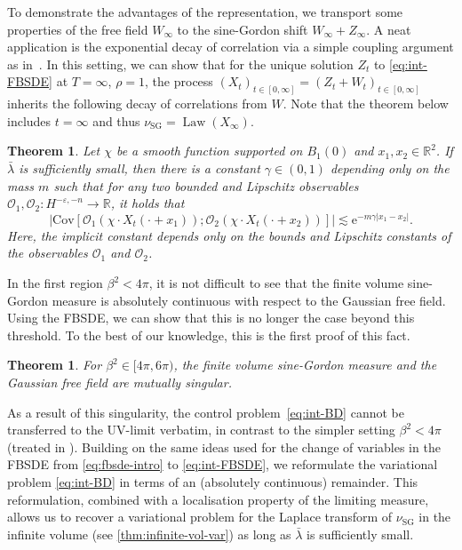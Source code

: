 \documentclass[11pt, a4paper]{scrartcl}
\numberwithin{equation}{section}
\theoremstyle{plain}
\newtheorem{theorem}[foo]{Theorem}
\theoremstyle{remark}
\newcommand{\mathe}{\mathrm{e}}
\newcommand{\tmop}[1]{\ensuremath{\operatorname{#1}}}
\begin{document}
To demonstrate the advantages of the representation, we transport some
properties of the free field $W_{\infty}$ to the sine-Gordon shift $W_{\infty}
+ Z_{\infty}$. A neat application is the exponential decay of correlation via
a simple coupling argument as
in~{\cite{vecchiStochasticAnalysisSubcritical2025, gubinelliDecayCorrelationsStochastic2025}}.
In this setting, we can show that for the unique solution $Z_t$ to
\eqref{eq:int-FBSDE} at $T = \infty$, $\rho = 1$, the process $(X_t)_{t \in
[0, \infty]} = (Z_t + W_t)_{t \in [0, \infty]}$ inherits the following decay
of correlations from $W$. Note that the theorem below includes $t = \infty$
and thus $\nu_{\tmop{SG}} = \tmop{Law} (X_{\infty})$.

\begin{theorem}
  \label{thm:decay-of-correlations}Let $\chi$ be a smooth function supported
  on $B_1 (0)$ and $x_1, x_2 \in \mathbb{R}^2$. If $\bar{\lambda}$ is sufficiently small,
  then there is a constant
  $\gamma \in (0, 1)$ depending only on the mass $m$ such that for any two
  bounded and Lipschitz observables $\mathcal{O}_1, \mathcal{O}_2 : H^{-
  \varepsilon, - n} \rightarrow \mathbb{R}$, it holds that
  \[ \left| \mathrm{Cov} [\mathcal{O}_1 (\chi \cdot X_t (\cdot + x_1)) ;
     \mathcal{O}_2 (\chi \cdot X_t (\cdot + x_2))]  \right| \lesssim \mathe^{- m \gamma | x_1 - x_2 |} . \]
  Here, the implicit constant depends only on the bounds and Lipschitz
  constants of the observables $\mathcal{O}_1$ and $\mathcal{O}_2$.
\end{theorem}

In the first region $\beta^2 < 4 \pi$, it is not difficult to see that the
finite volume sine-Gordon measure is absolutely continuous with respect to the
Gaussian free field. Using the FBSDE, we
can show that this is no longer the case beyond this threshold. To the best of
our knowledge, this is the first proof of this fact.

\begin{theorem}
  \label{thm:singularity}For $\beta^2 \in [4 \pi,6\pi)$, the finite volume
  sine-Gordon measure and the Gaussian free field are mutually singular.
\end{theorem}

As a result of this singularity, the control problem~\eqref{eq:int-BD} cannot
be transferred to the UV-limit verbatim, in contrast to the simpler setting
$\beta^2 < 4 \pi$ (treated in {\cite{barashkovStochasticControlApproach2022}}).
Building on the same ideas used for the change of variables in the FBSDE from
\eqref{eq:fbsde-intro} to \eqref{eq:int-FBSDE}, we reformulate the variational
problem \eqref{eq:int-BD} in terms of an (absolutely continuous) remainder.
This reformulation, combined with a localisation property of the limiting
measure, allows us to recover a variational problem for the Laplace transform
of $\nu_{\tmop{SG}}$ in the infinite volume (see \ref{thm:infinite-vol-var}) as long as $\bar{\lambda}$ is sufficiently small.
\end{document}
